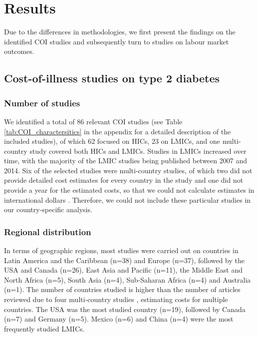\section{Results}
Due to the differences in methodologies, we first present the findings on the identified \ac{COI} studies and subsequently turn to studies on labour market outcomes.

\subsection{Cost-of-illness studies on type 2 diabetes}

\subsubsection{Number of studies}
We identified a total of 86 relevant \ac{COI} studies (see Table \ref{tab:COI_charactersitics} in the appendix for a detailed description of the included studies), of which 62 focused on \acp{HIC}, 23 on \acp{LMIC}, and one multi-country study covered both \acp{HIC} and \acp{LMIC}. Studies in \acp{LMIC} increased over time, with the majority of the \ac{LMIC} studies being published between 2007 and 2014. Six of the selected studies were multi-country studies, of which two \parencite{Kirigia2009,Smith-Spangler2012} did not provide detailed cost estimates for every country in the study and one did not provide a year for the estimated costs, so that we could not calculate estimates in international dollars \parencite{Boutayeb2014}. Therefore, we could not include these particular studies in our country-specific analysis.

\subsubsection{Regional distribution}
In terms of geographic regions, most studies were carried out on countries in Latin America and the Caribbean (n=38) and Europe (n=37), followed by the USA and Canada (n=26), East Asia and Pacific (n=11), the Middle East and North Africa (n=5), South Asia (n=4), Sub-Saharan Africa (n=4) and Australia (n=1). The number of countries studied is higher than the number of articles reviewed due to four multi-country studies \parencite{Boutayeb2014,Barcelo2003,Jonsson2002b,Abdulkadri2009b}, estimating costs for multiple countries. The USA was the most studied country (n=19), followed by Canada (n=7) and Germany (n=5). Mexico (n=6) and China (n=4) were the most frequently studied \acp{LMIC}.

